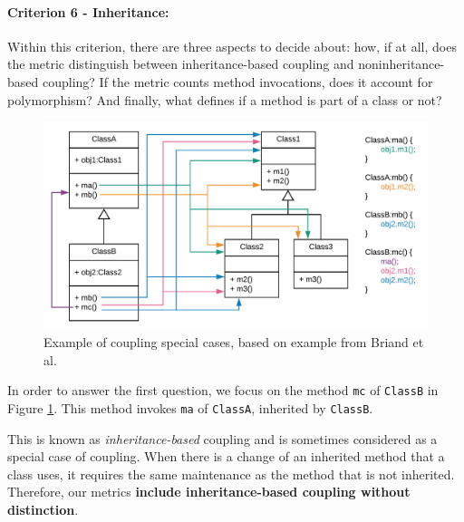 \paragraph{Criterion 6 - Inheritance:}
Within this criterion, there are three aspects to decide about: how, if at all, does the metric distinguish between inheritance-based coupling and noninheritance-based coupling? If the metric counts method invocations, does it account for polymorphism? And finally, what defines if a method is part of a class or not?

\begin{figure}[ht]
\begin{center}
\includegraphics[width=\textwidth]{figures/specialcases.png}
\caption{Example of coupling special cases, based on example from Briand et al. \cite{briand1999unified}}
\label{fig:specialcases}
\end{center}
\end{figure}

In order to answer the first question, we focus on the method \texttt{mc} of \texttt{ClassB} in Figure \ref{fig:specialcases}. This method invokes \texttt{ma} of \texttt{ClassA}, inherited by \texttt{ClassB}.

This is known as \textit{inheritance-based} coupling and is sometimes considered as a special case of coupling.
When there is a change of an inherited method that a class uses, it  requires the same maintenance as the method that is not inherited. Therefore, our metrics  \textbf{include inheritance-based coupling without distinction}.

